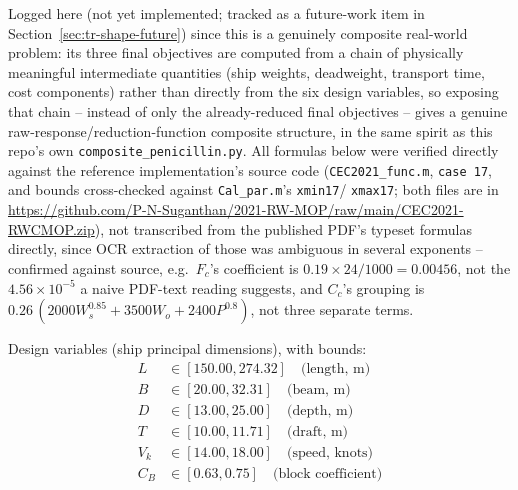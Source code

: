 \documentclass[11pt]{article}
\begin{document}
Logged here (not yet implemented; tracked as a future-work item in
Section~\ref{sec:tr-shape-future}) since this is a genuinely composite
real-world problem: its three final objectives are computed from a chain of
physically meaningful intermediate quantities (ship weights, deadweight,
transport time, cost components) rather than directly from the six design
variables, so exposing that chain -- instead of only the already-reduced
final objectives -- gives a genuine raw-response/reduction-function
composite structure, in the same spirit as this repo's own
\texttt{composite\_penicillin.py}. All formulas below were verified directly
against the reference implementation's source code
\citep{kumar2021rwcmop} (\texttt{CEC2021\_func.m}, \texttt{case 17}, and
bounds cross-checked against \texttt{Cal\_par.m}'s \texttt{xmin17}/
\texttt{xmax17}; both files are in
\url{https://github.com/P-N-Suganthan/2021-RW-MOP/raw/main/CEC2021-RWCMOP.zip}),
not transcribed from the published PDF's typeset formulas
directly, since OCR extraction of those was ambiguous in several exponents --
confirmed against source, e.g.\ $F_c$'s coefficient is
$0.19 \times 24 / 1000 = 0.00456$, not the $4.56\times10^{-5}$ a naive
PDF-text reading suggests, and $C_c$'s grouping is
$0.26\,(2000 W_s^{0.85} + 3500 W_o + 2400 P^{0.8})$, not three separate terms.

Design variables (ship principal dimensions), with bounds:
\begin{align}
L &\in [150.00, 274.32] \quad \text{(length, m)} \\
B &\in [20.00, 32.31] \quad \text{(beam, m)} \\
D &\in [13.00, 25.00] \quad \text{(depth, m)} \\
T &\in [10.00, 11.71] \quad \text{(draft, m)} \\
V_k &\in [14.00, 18.00] \quad \text{(speed, knots)} \\
C_B &\in [0.63, 0.75] \quad \text{(block coefficient)}
\end{align}
\end{document}
